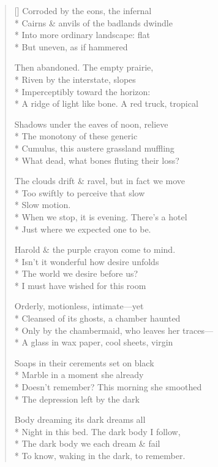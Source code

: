\label{ch:segue_elision}
\settowidth{\versewidth}{ \qquad  \qquad When we stop, it is evening. There's a hotel}
\begin{verse}[\versewidth]
Corroded by the eons, the infernal\\*
Cairns \& anvils of the badlands dwindle\\*
Into more ordinary landscape: flat\\*
But uneven, as if hammered

Then abandoned.  The empty prairie,\\*
Riven by the interstate, slopes\\*
Imperceptibly toward the horizon:\\*
A ridge of light like bone. A red truck, tropical

Shadows under the eaves of noon, relieve\\*
The monotony of these generic\\*
Cumulus, this austere grassland muffling\\*
What dead, what bones fluting their loss?

The clouds drift \& ravel, but in fact we move\\*
Too swiftly to perceive that slow\\*
Slow motion.\\*
 \qquad  \qquad When we stop, it is evening. There's a hotel\\*
Just where we expected one to be.

Harold \& the purple crayon come to mind.\\*
Isn't it wonderful how desire unfolds\\*
The world we desire before us?\\*
I must have wished for this room

Orderly, motionless, intimate---yet\\*
Cleansed of its ghosts, a chamber haunted\\*
Only by the chambermaid, who leaves her traces---\\*
A glass in wax paper, cool sheets, virgin

Soaps in their cerements set on black\\*
Marble in a moment she already\\*
Doesn't remember?  This morning she smoothed\\*
The depression left by the dark

Body dreaming its dark dreams all\\*
Night in this bed. The dark body I follow,\\*
The dark body we each dream \& fail\\*
To know, waking in the dark, to remember.
\end{verse}
